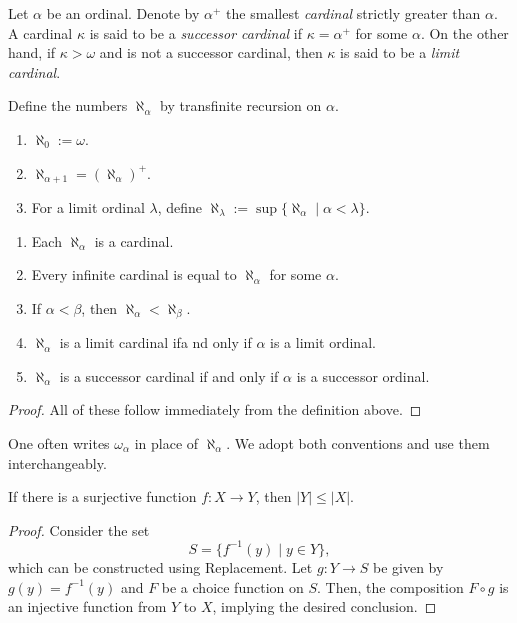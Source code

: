 \begin{definition}
    Let $\alpha$ be an ordinal. Denote by $\alpha^+$ the smallest \emph{cardinal} strictly greater than $\alpha$. A cardinal $\kappa$ is said to be a \emph{successor cardinal} if $\kappa = \alpha^+$ for some $\alpha$. On the other hand, if $\kappa > \omega$ and is not a successor cardinal, then $\kappa$ is said to be a \emph{limit cardinal}.
\end{definition}

\begin{definition}
    Define the numbers $\aleph_\alpha$ by transfinite recursion on $\alpha$.
    \begin{enumerate}[label=(\alph*)]
        \item $\aleph_0 := \omega$.
        \item $\aleph_{\alpha + 1} = (\aleph_\alpha)^+$.
        \item For a limit ordinal $\lambda$, define $\aleph_\lambda := \sup\{\aleph_\alpha\mid \alpha < \lambda\}$.
    \end{enumerate}
\end{definition}

\begin{theorem}
\begin{enumerate}[label=(\alph*)]
    \item Each $\aleph_\alpha$ is a cardinal.
    \item Every infinite cardinal is equal to $\aleph_\alpha$ for some $\alpha$.
    \item If $\alpha < \beta$, then $\aleph_\alpha < \aleph_\beta$. 
    \item $\aleph_\alpha$ is a limit cardinal ifa nd only if $\alpha$ is a limit ordinal. 
    \item $\aleph_\alpha$ is a successor cardinal if and only if $\alpha$ is a successor ordinal.
\end{enumerate}
\end{theorem}
\begin{proof}
    All of these follow immediately from the definition above.
\end{proof}

\begin{remark}
    One often writes $\omega_\alpha$ in place of $\aleph_\alpha$. We adopt both conventions and use them interchangeably.
\end{remark}

\begin{lemma}
    If there is a surjective function $f:X\to Y$, then $|Y|\le|X|$.
\end{lemma}
\begin{proof}
    Consider the set 
    \begin{equation*}
        S = \{f^{-1}(y)\mid y\in Y\},
    \end{equation*}
    which can be constructed using Replacement. Let $g: Y\to S$ be given by $g(y) = f^{-1}(y)$ and $F$ be a choice function on $S$. Then, the composition $F\circ g$ is an injective function from $Y$ to $X$, implying the desired conclusion.
\end{proof}

